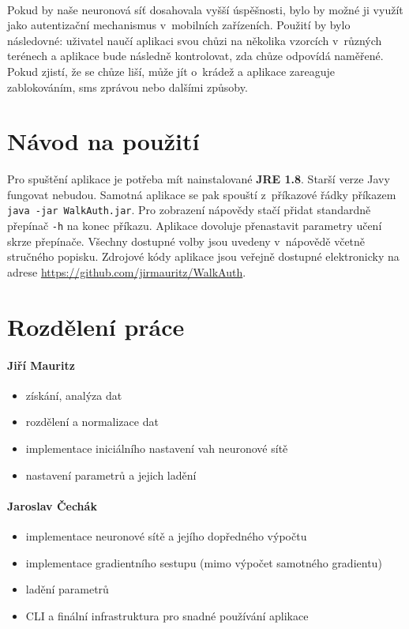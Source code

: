 \documentclass[a4paper, 10pt, twocolumn]{article}
\begin{document}
    \paragraph{}
    Pokud by naše neuronová síť dosahovala vyšší úspěšnosti, bylo by možné ji využít jako autentizační mechanismus v~mobilních zařízeních. Použití by bylo následovné: uživatel naučí aplikaci svou chůzi na několika vzorcích v~různých terénech a aplikace bude následně kontrolovat, zda chůze odpovídá naměřené. Pokud zjistí, že se chůze liší, může jít o~krádež a aplikace zareaguje zablokováním, sms zprávou nebo dalšími způsoby.
    
\appendix
\section{Návod na použití}
Pro spuštění aplikace je potřeba mít nainstalované \textbf{JRE 1.8}. Starší verze Javy fungovat nebudou. Samotná aplikace se pak spouští z~příkazové řádky příkazem \texttt{java -jar WalkAuth.jar}. Pro zobrazení nápovědy stačí přidat standardně přepínač \texttt{-h} na konec příkazu. Aplikace dovoluje přenastavit parametry učení skrze přepínače. Všechny dostupné volby jsou uvedeny v~nápovědě včetně stručného popisku. Zdrojové kódy aplikace jsou veřejně dostupné elektronicky na adrese \url{https://github.com/jirmauritz/WalkAuth}.

\section{Rozdělení práce}
\paragraph{Jiří Mauritz}
\begin{itemize}
  \item získání, analýza dat
  \item rozdělení a normalizace dat
  \item implementace iniciálního nastavení vah neuronové sítě
  \item nastavení parametrů a jejich ladění
\end{itemize}


\paragraph{Jaroslav Čechák}
\begin{itemize}
\item implementace neuronové sítě a jejího dopředného výpočtu
\item implementace gradientního sestupu (mimo výpočet samotného gradientu)
\item ladění parametrů
\item CLI a finální infrastruktura pro snadné používání aplikace
\end{itemize}
\end{document}
